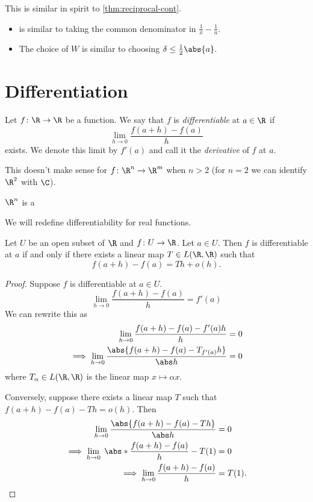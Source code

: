 \begin{remark}
    This is similar in spirit to \cref{thm:reciprocal-cont}.
    \begin{itemize}
        \item {} is similar to taking the common
        denominator in $\frac1x - \frac1a$.
        \item The choice of $W$ is similar to choosing
        $\delta \le \frac12\abs{a}$.
    \end{itemize}
\end{remark}

\chapter{Differentiation} \label{chp:diff}
\begin{definition}
    Let $f\colon \R \to \R$ be a function.
    We say that $f$ is \emph{differentiable} at $a \in \R$ if \[
        \lim_{h \to 0} \frac{f(a + h) - f(a)}{h}
    \] exists.
    We denote this limit by $f'(a)$ and call it the \emph{derivative}
    of $f$ at $a$.
\end{definition}
This doesn't make sense for $f\colon \R^n \to \R^m$ when $n > 2$
(for $n = 2$ we can identify $\R^2$ with $\C$).

\begin{theorem} \label{thm:diff:hurwitz}
    $\R^n$ is a 
\end{theorem}

We will redefine differentiability for real functions.
\begin{proposition*}
    Let $U$ be an open subset of $\R$ and $f\colon U \to \R$.
    Let $a \in U$.
    Then $f$ is differentiable at $a$ if and only if there exists
    a linear map $T \in L(\R, \R)$ such that \[
        f(a + h) - f(a) = Th + o(h).
    \]
\end{proposition*}
\begin{proof}
    Suppose $f$ is differentiable at $a \in U$. \[
        \lim_{h \to 0} \frac{f(a + h) - f(a)}h = f'(a)
    \]
    We can rewrite this as \begin{align*}
        \lim_{h \to 0} \frac{f(a + h) - f(a) - f'(a)h}h &= 0 \\
        \implies \lim_{h \to 0} \frac{\abs{f(a + h) - f(a) - T_{f'(a)}h}}{\abs h} &= 0
    \end{align*} where $T_\alpha \in L(\R, \R)$ is the linear map
    $x \mapsto \alpha x$.

    Conversely, suppose there exists a linear map $T$ such that
    $f(a + h) - f(a) - Th = o(h)$.
    Then \begin{align*}
        \lim_{h \to 0} \frac{\abs{f(a + h) - f(a) - Th}}{\abs h} &= 0 \\
        \implies \lim_{h \to 0}\;\abs*{\frac{f(a+h) - f(a)}h - T(1)} &= 0 \\
        \implies \lim_{h \to 0} \frac{f(a + h) - f(a)}h &= T(1). \qedhere
    \end{align*}
\end{proof}
